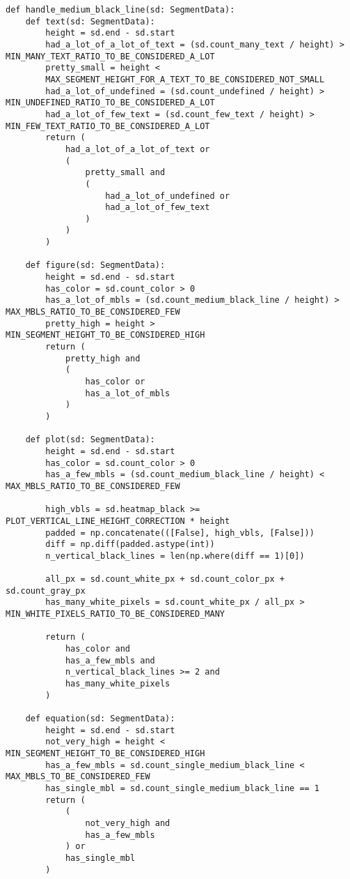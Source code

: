\begin{lstlisting}[caption={Функция handle\_medium\_black\_line}, label={lst:}]
def handle_medium_black_line(sd: SegmentData):
    def text(sd: SegmentData):
        height = sd.end - sd.start
        had_a_lot_of_a_lot_of_text = (sd.count_many_text / height) > MIN_MANY_TEXT_RATIO_TO_BE_CONSIDERED_A_LOT
        pretty_small = height <
        MAX_SEGMENT_HEIGHT_FOR_A_TEXT_TO_BE_CONSIDERED_NOT_SMALL
        had_a_lot_of_undefined = (sd.count_undefined / height) > MIN_UNDEFINED_RATIO_TO_BE_CONSIDERED_A_LOT
        had_a_lot_of_few_text = (sd.count_few_text / height) > MIN_FEW_TEXT_RATIO_TO_BE_CONSIDERED_A_LOT
        return (
            had_a_lot_of_a_lot_of_text or
            (
                pretty_small and
                (
                    had_a_lot_of_undefined or
                    had_a_lot_of_few_text
                )
            )
        )

    def figure(sd: SegmentData):
        height = sd.end - sd.start
        has_color = sd.count_color > 0
        has_a_lot_of_mbls = (sd.count_medium_black_line / height) > MAX_MBLS_RATIO_TO_BE_CONSIDERED_FEW
        pretty_high = height > MIN_SEGMENT_HEIGHT_TO_BE_CONSIDERED_HIGH
        return (
            pretty_high and
            (
                has_color or
                has_a_lot_of_mbls
            )
        )

    def plot(sd: SegmentData):
        height = sd.end - sd.start
        has_color = sd.count_color > 0
        has_a_few_mbls = (sd.count_medium_black_line / height) < MAX_MBLS_RATIO_TO_BE_CONSIDERED_FEW

        high_vbls = sd.heatmap_black >= PLOT_VERTICAL_LINE_HEIGHT_CORRECTION * height
        padded = np.concatenate(([False], high_vbls, [False]))
        diff = np.diff(padded.astype(int))
        n_vertical_black_lines = len(np.where(diff == 1)[0])

        all_px = sd.count_white_px + sd.count_color_px + sd.count_gray_px
        has_many_white_pixels = sd.count_white_px / all_px > MIN_WHITE_PIXELS_RATIO_TO_BE_CONSIDERED_MANY

        return (
            has_color and
            has_a_few_mbls and
            n_vertical_black_lines >= 2 and
            has_many_white_pixels
        )

    def equation(sd: SegmentData):
        height = sd.end - sd.start
        not_very_high = height < MIN_SEGMENT_HEIGHT_TO_BE_CONSIDERED_HIGH
        has_a_few_mbls = sd.count_single_medium_black_line < MAX_MBLS_TO_BE_CONSIDERED_FEW
        has_single_mbl = sd.count_single_medium_black_line == 1
        return (
            (
                not_very_high and
                has_a_few_mbls
            ) or
            has_single_mbl
        )


\end{lstlisting}
